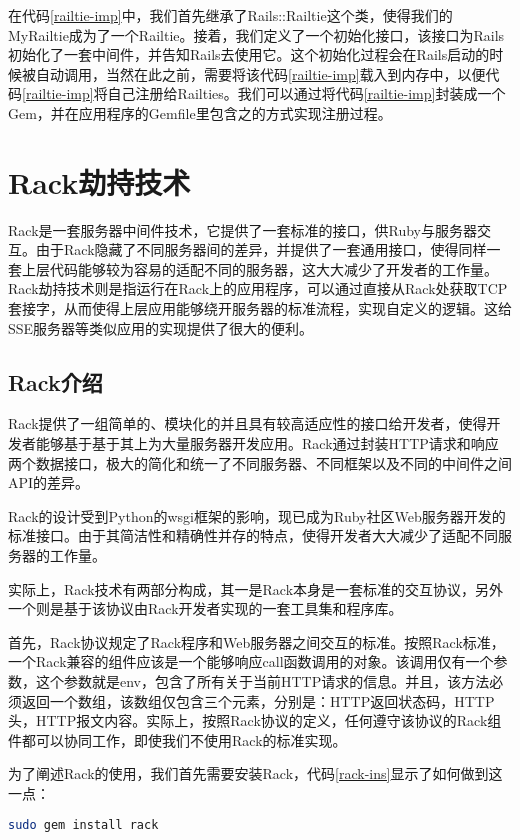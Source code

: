 在代码\ref{railtie-imp}中，我们首先继承了Rails::Railtie这个类，使得我们的MyRailtie成为了一个Railtie。接着，我们定义了一个初始化接口，该接口为Rails初始化了一套中间件，并告知Rails去使用它。这个初始化过程会在Rails启动的时候被自动调用，当然在此之前，需要将该代码\ref{railtie-imp}载入到内存中，以便代码\ref{railtie-imp}将自己注册给Railties。我们可以通过将代码\ref{railtie-imp}封装成一个Gem，并在应用程序的Gemfile里包含之的方式实现注册过程。

\section{Rack劫持技术}
Rack是一套服务器中间件技术，它提供了一套标准的接口，供Ruby与服务器交互。由于Rack隐藏了不同服务器间的差异，并提供了一套通用接口，使得同样一套上层代码能够较为容易的适配不同的服务器，这大大减少了开发者的工作量。Rack劫持技术则是指运行在Rack上的应用程序，可以通过直接从Rack处获取TCP套接字，从而使得上层应用能够绕开服务器的标准流程，实现自定义的逻辑。这给SSE服务器等类似应用的实现提供了很大的便利。

\subsection{Rack介绍}
Rack提供了一组简单的、模块化的并且具有较高适应性的接口给开发者，使得开发者能够基于基于其上为大量服务器开发应用。Rack通过封装HTTP请求和响应两个数据接口，极大的简化和统一了不同服务器、不同框架以及不同的中间件之间API的差异。

Rack的设计受到Python的wsgi框架的影响，现已成为Ruby社区Web服务器开发的标准接口。由于其简洁性和精确性并存的特点，使得开发者大大减少了适配不同服务器的工作量。

实际上，Rack技术有两部分构成，其一是Rack本身是一套标准的交互协议，另外一个则是基于该协议由Rack开发者实现的一套工具集和程序库。

首先，Rack协议规定了Rack程序和Web服务器之间交互的标准。按照Rack标准，一个Rack兼容的组件应该是一个能够响应call函数调用的对象。该调用仅有一个参数，这个参数就是env，包含了所有关于当前HTTP请求的信息。并且，该方法必须返回一个数组，该数组仅包含三个元素，分别是：HTTP返回状态码，HTTP头，HTTP报文内容。实际上，按照Rack协议的定义，任何遵守该协议的Rack组件都可以协同工作，即使我们不使用Rack的标准实现。

为了阐述Rack的使用，我们首先需要安装Rack，代码\ref{rack-ins}显示了如何做到这一点：
\begin{lstlisting}[caption={安装Rack}, label=rack-ins, language=bash, numbers=none]
sudo gem install rack
\end{lstlisting}

